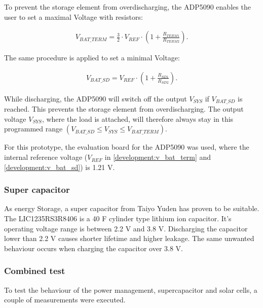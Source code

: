To prevent the storage element from overdischarging, the ADP5090 enables the user to set a maximal Voltage with resistors:

\begin{align}
	V_{BAT\_TERM} = \frac{3}{2}\cdot V_{REF}\cdot\left(1+\frac{R_{TERM1}}{R_{TERM2}} \right).\label{development:v_bat_term} 
\end{align} 

The same procedure is applied to set a minimal Voltage:

\begin{align}
	V_{BAT\_SD}=V_{REF}\cdot \left(1+\frac{R_{SD1}}{R_{SD2}} \right).\label{development:v_bat_sd} 
\end{align}  

While discharging, the ADP5090 will switch off the output $V_{SYS}$ if $V_{BAT\_SD}$ is reached. This prevents the storage element from overdischarging.
The output voltage $V_{SYS}$, where the load is attached, will therefore always stay in this programmed range $(V_{BAT\_SD}\le V_{SYS}\le V_{BAT\_TERM})$.
\cite{adp}

For this prototype, the evaluation board for the ADP5090 was used, where the internal reference voltage ($V_{REF}$ in \eqref{development:v_bat_term} and \eqref{development:v_bat_sd}) is 1.21 V. \cite{adp_eval}

\subsubsection{Super capacitor}
As energy Storage, a super capacitor from Taiyo Yuden has proven to be suitable.
The LIC1235RS3R8406 is a 40 F cylinder type lithium ion capacitor.
It's operating voltage range is between 2.2 V and 3.8 V.
Discharging the capacitor lower than 2.2 V causes shorter lifetime and higher leakage.
The same unwanted behaviour occurs when charging the capacitor over 3.8 V.
\cites{yuden}

\subsubsection{Combined test}
To test the behaviour of the power management, supercapacitor and solar cells, a couple of measurements were executed.

